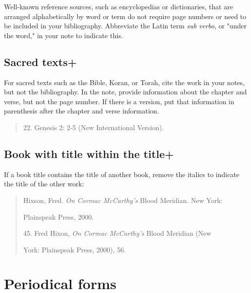  Well-known reference sources, such as encyclopedias or dictionaries, that are arranged alphabetically
by word or term do not require page numbers or need to be included in your bibliography. Abbreviate the Latin term \emph{sub verbo}, or "under the word," in your note to indicate this.

\subsection{Sacred texts+}

For sacred texts such as the Bible, Koran, or Torah, cite the work in your notes, but not the bibliography. In the note, provide information about the chapter and verse, but not the page number. If there is a version, put that information in
parenthesis after the chapter and verse information.

\begin{quote}

\hspace{.4in}22. Genesis 2: 2-5 (New International Version).

\end{quote}

\subsection{Book with title within the title+}
If a book title contains the title of another book, remove the italics to indicate the title
of the other work:

\begin{quote}
Hixson, Fred. \emph{On Cormac McCarthy's }Blood Meridian. New York: 

\hspace{.4in}Plainspeak Press, 2000.

\medskip

\hspace{.4in}45. Fred Hixon, \emph{On Cormac McCarthy's} Blood Meridian (New

York: Plainspeak Press, 2000), 56.

\end{quote}




\section{Periodical forms}

